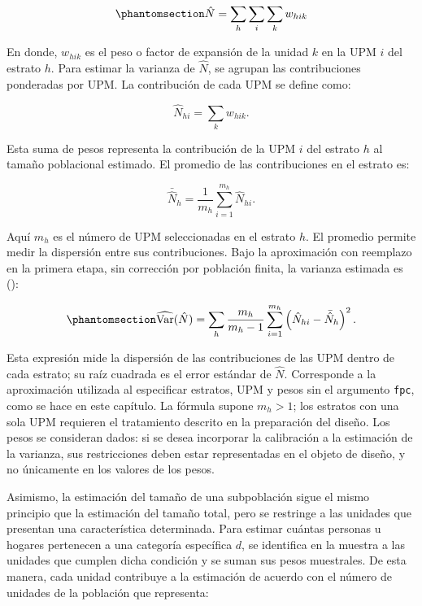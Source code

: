 \documentclass[
  spanish,
  11pt,
  letterpaper,
  oneside,
  open=any]{scrbook}
\begin{document}
\begin{equation}\protect\phantomsection\label{eq-tamano-poblacional}{
\hat{N} = \sum_{h} \sum_{i} \sum_{k} w_{hik}
}\end{equation}

En donde, \(w_{hik}\) es el peso o factor de expansión de la unidad
\(k\) en la UPM \(i\) del estrato \(h\). Para estimar la varianza de
\(\hat{N}\), se agrupan las contribuciones ponderadas por UPM. La
contribución de cada UPM se define como:

\[
\hat{N}_{hi}=\sum_k w_{hik}.
\]

Esta suma de pesos representa la contribución de la UPM \(i\) del
estrato \(h\) al tamaño poblacional estimado. El promedio de las
contribuciones en el estrato es:

\[
\bar{\hat{N}}_h=\frac{1}{m_h}\sum_{i=1}^{m_h}\hat{N}_{hi}.
\]

Aquí \(m_h\) es el número de UPM seleccionadas en el estrato \(h\). El
promedio permite medir la dispersión entre sus contribuciones. Bajo la
aproximación con reemplazo en la primera etapa, sin corrección por
población finita, la varianza estimada es
():

\begin{equation}\protect\phantomsection\label{eq-varianza-tamano-poblacional}{
\widehat{\operatorname{Var}}(\hat{N})
=
\sum_h \frac{m_h}{m_h-1}
\sum_{i=1}^{m_h}\left(\hat{N}_{hi}-\bar{\hat{N}}_h\right)^2.
}\end{equation}

Esta expresión mide la dispersión de las contribuciones de las UPM
dentro de cada estrato; su raíz cuadrada es el error estándar de
\(\hat{N}\). Corresponde a la aproximación utilizada al especificar
estratos, UPM y pesos sin el argumento \texttt{fpc}, como se hace en
este capítulo. La fórmula supone \(m_h>1\); los estratos con una sola
UPM requieren el tratamiento descrito en la preparación del diseño. Los
pesos se consideran dados: si se desea incorporar la calibración a la
estimación de la varianza, sus restricciones deben estar representadas
en el objeto de diseño, y no únicamente en los valores de los pesos.

Asimismo, la estimación del tamaño de una subpoblación sigue el mismo
principio que la estimación del tamaño total, pero se restringe a las
unidades que presentan una característica determinada. Para estimar
cuántas personas u hogares pertenecen a una categoría específica \(d\),
se identifica en la muestra a las unidades que cumplen dicha condición y
se suman sus pesos muestrales. De esta manera, cada unidad contribuye a
la estimación de acuerdo con el número de unidades de la población que
representa:
\end{document}

